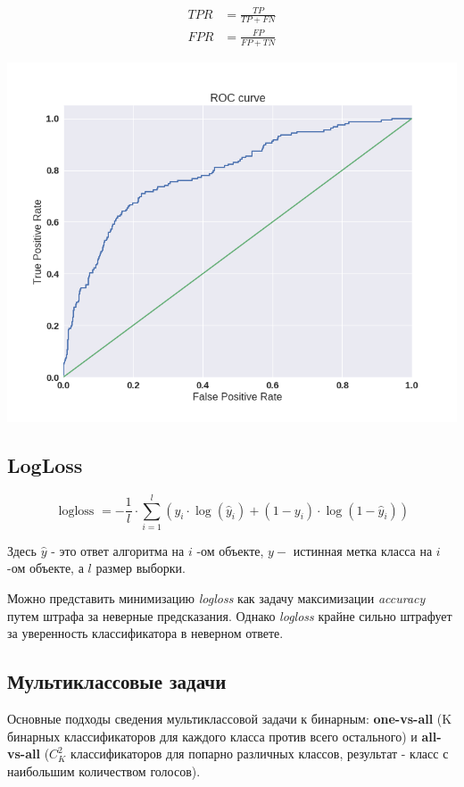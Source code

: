 $$
\begin{aligned}
T P R &=\frac{T P}{T P+F N} \\
F P R &=\frac{F P}{F P+T N}
\end{aligned}
$$
\begin{center}
    \includegraphics[scale=0.6]{tickets/pictures/curve.png}
\end{center}

\subsection{LogLoss}
$$
\text { logloss }=-\frac{1}{l} \cdot \sum_{i=1}^{l}\left(y_{i} \cdot \log \left(\hat{y}_{i}\right)+\left(1-y_{i}\right) \cdot \log \left(1-\hat{y}_{i}\right)\right)
$$

Здесь $\hat{y}$ - это ответ алгоритма на $i$ -ом объекте, $y-$ истинная метка класса на $i$ -ом объекте, а $l$ размер
выборки.

Можно представить минимизацию \textit{logloss} как задачу максимизации \textit{accuracy} путем штрафа за неверные предсказания. Однако \textit{logloss} крайне сильно штрафует за уверенность классификатора в неверном ответе.

\subsection{Мультиклассовые задачи}

Основные подходы сведения мультиклассовой задачи к бинарным: \textbf{one-vs-all} (K бинарных классификаторов для каждого класса против всего остального) и \textbf{all-vs-all} ($C_{K}^{2}$ классификаторов для попарно различных классов, результат - класс с наибольшим количеством голосов).

